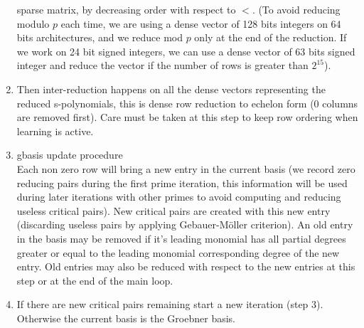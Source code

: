 \documentclass[a4paper,11pt]{book}
\begin{document}
\begin{giacjshere}
\begin{enumerate}
sparse matrix, by decreasing order with respect to $<$.
(To avoid reducing modulo $p$ each time, we are using a dense
vector of 128 bits integers on 64 bits architectures, 
and we reduce mod $p$ only at the end of the reduction. If
we work on 24 bit signed integers, we can use a dense vector 
of 63 bits signed integer and reduce the vector if the number
of rows is greater than $2^{15}$).
\item Then inter-reduction happens on all the dense vectors representing
the reduced s-polynomials, this is dense row
reduction to echelon form (0 columns are removed first). 
Care must be taken at this step
to keep row ordering when learning is active.
\item gbasis update procedure\\
Each non zero row will bring a new entry in the current
basis (we record zero reducing pairs during the first prime iteration,
this information will be used during later iterations with other
primes to avoid computing and reducing
useless critical pairs). 
New critical pairs are created with this new entry (discarding useless
pairs by applying Gebauer-M\"oller criterion).
An old entry in the basis may be removed if it's leading monomial
has all partial degrees greater or equal to the leading monomial
corresponding degree of the new entry.
Old entries may also be reduced with respect to the new entries 
at this step or at the end of the main loop.
\item If there are new critical pairs remaining start a new iteration
  (step 3). Otherwise the current basis is the Groebner basis.
\end{enumerate}


\end{giacjshere}
\end{document}
